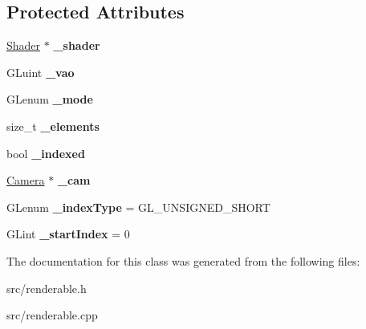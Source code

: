 \subsection*{Protected Attributes}
\begin{DoxyCompactItemize}
\item 
\hypertarget{class_renderable_aa0d63de6e1ff200bedf42fe598770ecc}{}\hyperlink{class_shader}{Shader} $\ast$ {\bfseries \+\_\+shader}\label{class_renderable_aa0d63de6e1ff200bedf42fe598770ecc}

\item 
\hypertarget{class_renderable_abd0605b721dfd91570553e59934d5c36}{}G\+Luint {\bfseries \+\_\+vao}\label{class_renderable_abd0605b721dfd91570553e59934d5c36}

\item 
\hypertarget{class_renderable_a8d09b0daa5ca8547d48e2bf464818461}{}G\+Lenum {\bfseries \+\_\+mode}\label{class_renderable_a8d09b0daa5ca8547d48e2bf464818461}

\item 
\hypertarget{class_renderable_a82ef267d43ff2396e4676ababbaacf74}{}size\+\_\+t {\bfseries \+\_\+elements}\label{class_renderable_a82ef267d43ff2396e4676ababbaacf74}

\item 
\hypertarget{class_renderable_ac35a8d537a915b392195b2d35f3fbf23}{}bool {\bfseries \+\_\+indexed}\label{class_renderable_ac35a8d537a915b392195b2d35f3fbf23}

\item 
\hypertarget{class_renderable_a6fee6e5a1d0181d37ce1eb5fb47278ee}{}\hyperlink{class_camera}{Camera} $\ast$ {\bfseries \+\_\+cam}\label{class_renderable_a6fee6e5a1d0181d37ce1eb5fb47278ee}

\item 
\hypertarget{class_renderable_a93095af76e9ef9da9c07bb8e91aa85da}{}G\+Lenum {\bfseries \+\_\+index\+Type} = G\+L\+\_\+\+U\+N\+S\+I\+G\+N\+E\+D\+\_\+\+S\+H\+O\+R\+T\label{class_renderable_a93095af76e9ef9da9c07bb8e91aa85da}

\item 
\hypertarget{class_renderable_a05b860b3426a5f6bc27c734d23bb26bd}{}G\+Lint {\bfseries \+\_\+start\+Index} = 0\label{class_renderable_a05b860b3426a5f6bc27c734d23bb26bd}

\end{DoxyCompactItemize}


The documentation for this class was generated from the following files\+:\begin{DoxyCompactItemize}
\item 
src/renderable.\+h\item 
src/renderable.\+cpp\end{DoxyCompactItemize}
